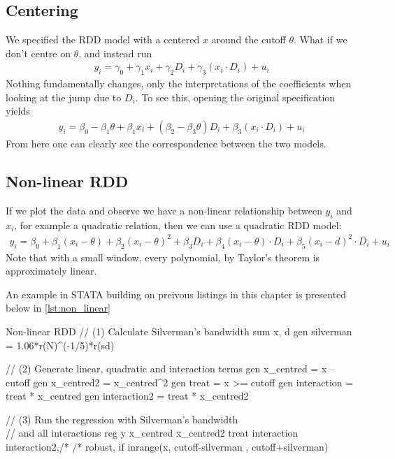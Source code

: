         \subsection{Centering}
            We specified the RDD model with a centered $x$ around the cutoff $\theta$. What if we don’t centre on $\theta$, and instead run
            \begin{align}
                y_i = \gamma_0 + \gamma_1 x_i + \gamma_2 D_i + \gamma_3 (x_i \cdot D_i) + u_i
            \end{align}
            Nothing fundamentally changes, only the interpretations of the coefficients when looking at the jump due to $D_i$. To see this, opening the original specification yields
            \begin{align}
                y_i = \beta_0 - \beta_1 \theta + \beta_1 x_i + (\beta_2 - \beta_3\theta) D_i + \beta_3 (x_i \cdot D_i) + u_i
            \end{align}
            From here one can clearly see the correspondence between the two models.

        \subsection{Non-linear RDD}
            If we plot the data and observe we have a non-linear relationship between $y_i$ and $x_i$, for example a quadratic relation, then we can use a quadratic RDD model:
            \begin{align}
                y_i = \beta_0 +\beta_1 (x_i- \theta) + \beta_2 (x_i-\theta)^2+ \beta_3 D_i + \beta_4 (x_i-\theta)\cdot D_i+\beta_5 (x_i-d)^2\cdot D_i + u_i
            \end{align}
            Note that with a small window, every polynomial, by Taylor’s theorem is approximately linear. 
	        
            An example in STATA building on preivous listings in this chapter is presented below in \ref{lst:non_linear}
            
            \begin{sexylisting}[colback=white, label=lst:RDD/non_linear]{Non-linear RDD}
//  (1) Calculate Silverman's bandwidth
    sum x, d
    gen silverman = 1.06*r(N)^(-1/5)*r(sd)

//  (2) Generate linear, quadratic and interaction terms
    gen x_centred = x – cutoff
    gen x_centred2 = x_centred^2
    gen treat = x >= cutoff
    gen interaction = treat * x_centred
    gen interaction2 = treat * x_centred2
    
//  (3) Run the regression with Silverman's bandwidth \\
//      and all interactions
    reg y x_centred x_centred2 treat interaction interaction2,/*
    /* robust, if inrange(x, cutoff-silverman , cutoff+silverman) 
            \end{sexylisting}


                




            

            